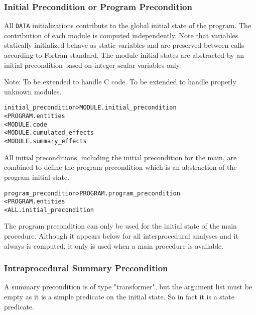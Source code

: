 \documentclass[a4paper]{report}
\newenvironment{PipsMake}{\begin{alltt}}{\end{alltt}}
\newenvironment{PipsPass}[1]{\label{pass:#1}}{}
\begin{document}
\subsubsection{Initial Precondition or Program Precondition}
\label{subsubsection-initial-precs}

All \texttt{DATA} initializations contribute to the global initial state
of the program. The contribution of each module is computed independently.
Note that variables statically initialized behave as static variables and
are preserved between calls according to Fortran standard. The module
initial states are abstracted by an initial precondition based on integer
scalar variables only.

Note: To be extended to handle C code. To be extended to handle properly
unknown modules.

\begin{PipsMake}
initial_precondition     > MODULE.initial_precondition
        < PROGRAM.entities
        < MODULE.code
        < MODULE.cumulated_effects
        < MODULE.summary_effects
\end{PipsMake}

All initial preconditions, including the initial precondition for the
main, are combined to define the program precondition which is an
abstraction of the program initial state.

\begin{PipsMake}
program_precondition     > PROGRAM.program_precondition
        < PROGRAM.entities
        < ALL.initial_precondition
\end{PipsMake}

The program precondition can only be used for the initial state of the
main procedure. Although it appears below for all interprocedural analyses
and it always is computed, it only is used when a main procedure is
available.

\subsubsection{Intraprocedural Summary Precondition}

\begin{PipsPass}{intraprocedural_summary_precondition}
A summary precondition is of type "transformer", but the argument list
must be empty as it is a simple predicate on the initial state. So in fact
it is a state predicate.
\end{PipsPass}
\end{document}
